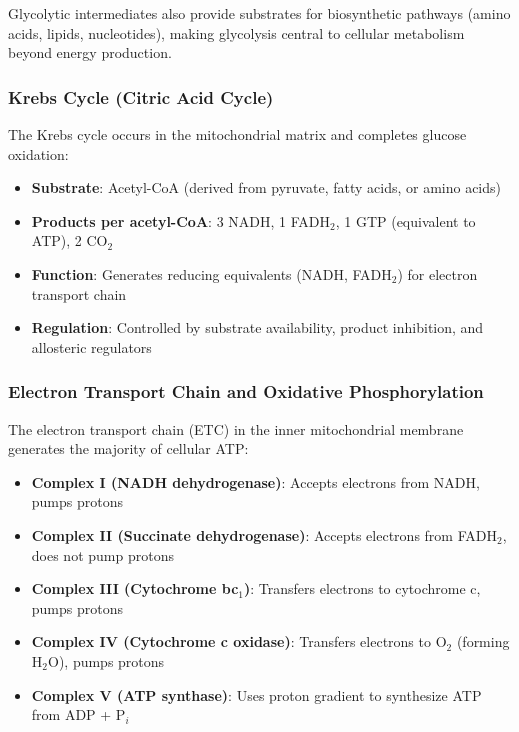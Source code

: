 Glycolytic intermediates also provide substrates for biosynthetic pathways (amino acids, lipids, nucleotides), making glycolysis central to cellular metabolism beyond energy production.

\subsubsection{Krebs Cycle (Citric Acid Cycle)}

The Krebs cycle occurs in the mitochondrial matrix and completes glucose oxidation:

\begin{itemize}
    \item \textbf{Substrate}: Acetyl-CoA (derived from pyruvate, fatty acids, or amino acids)
    \item \textbf{Products per acetyl-CoA}: 3 NADH, 1 FADH$_2$, 1 GTP (equivalent to ATP), 2 CO$_2$
    \item \textbf{Function}: Generates reducing equivalents (NADH, FADH$_2$) for electron transport chain
    \item \textbf{Regulation}: Controlled by substrate availability, product inhibition, and allosteric regulators
\end{itemize}

\subsubsection{Electron Transport Chain and Oxidative Phosphorylation}

The electron transport chain (ETC) in the inner mitochondrial membrane generates the majority of cellular ATP:

\begin{itemize}
    \item \textbf{Complex I (NADH dehydrogenase)}: Accepts electrons from NADH, pumps protons
    \item \textbf{Complex II (Succinate dehydrogenase)}: Accepts electrons from FADH$_2$, does not pump protons
    \item \textbf{Complex III (Cytochrome bc$_1$)}: Transfers electrons to cytochrome c, pumps protons
    \item \textbf{Complex IV (Cytochrome c oxidase)}: Transfers electrons to O$_2$ (forming H$_2$O), pumps protons
    \item \textbf{Complex V (ATP synthase)}: Uses proton gradient to synthesize ATP from ADP + P$_i$
\end{itemize}

